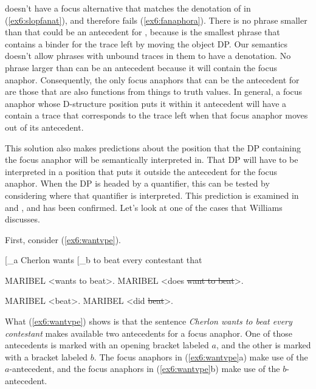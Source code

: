 \vspace*{-30pt}
 doesn't have a focus alternative that matches the denotation of  in (\ref{ex6:slopfanat}), and therefore fails (\ref{ex6:fanaphora}). There is no phrase smaller than  that could be an antecedent for , because  is the smallest phrase that contains a binder for the trace left by moving the object DP. Our semantics doesn't allow phrases with unbound traces in them to have a denotation. No phrase larger than  can be an antecedent because it will contain the focus anaphor. Consequently, the only focus anaphors that  can be the antecedent for are those that are also functions from things to truth values. In general, a focus anaphor whose D-structure position puts it within it antecedent will have a contain a trace that corresponds to the trace left when that focus anaphor moves out of its antecedent.

This solution also makes predictions about the position that the DP containing the focus anaphor will be semantically interpreted in. That DP will have to be interpreted in a position that puts it outside the antecedent for the focus anaphor. When the DP is headed by a quantifier, this can be tested by considering where that quantifier is interpreted. This prediction is examined in \citet{Williams:1977} and \citet{Sag:1976}, and has been confirmed. Let's look at one of the cases that Williams discusses. 

First, consider (\ref{ex6:wantvpe}).
\begin{exe}
\raggedright
	\ex \label{ex6:wantvpe}
	{}[_a Cherlon wants [_b to beat every contestant that
		\begin{xlist}
			\ex
			\begin{xlist}
			\ex MARIBEL <wants to beat>.
			\ex MARIBEL <does \sout{want to beat}>.
			\end{xlist}
			\ex
			\begin{xlist}
				\ex MARIBEL <beat>.
				\ex MARIBEL <did \sout{beat}>.
			\end{xlist}
		\end{xlist}
\end{exe}
What (\ref{ex6:wantvpe}) shows is that the sentence \textit{Cherlon wants to beat every contestant} makes available two antecedents for a focus anaphor. One of those antecedents is marked with an opening bracket labeled $a$, and the other is marked with a bracket labeled $b$. The focus anaphors in (\ref{ex6:wantvpe}a) make use of the $a$-antecedent, and the focus anaphors in (\ref{ex6:wantvpe}b) make use of the $b$-antecedent. 

